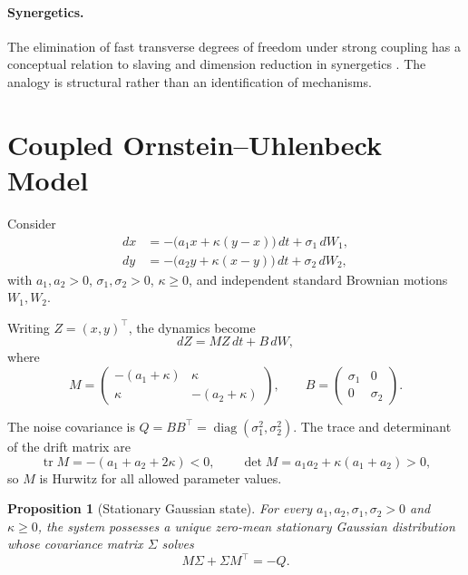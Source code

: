 \documentclass[11pt]{article}
\theoremstyle{plain}
\newtheorem{proposition}{Proposition}
\theoremstyle{remark}
\newcommand{\tr}{\operatorname{tr}}
\begin{document}
\paragraph{Synergetics.} The elimination of fast transverse degrees of freedom under strong
coupling has a conceptual relation to slaving and dimension reduction in synergetics
\cite{Haken1983}. The analogy is structural rather than an identification of mechanisms.

\section{Coupled Ornstein--Uhlenbeck Model}

Consider
\begin{align}
  dx &= -\bigl(a_1x+\kappa(y-x)\bigr)\,dt+\sigma_1\,dW_1, \label{eq:sde1}\\
  dy &= -\bigl(a_2y+\kappa(x-y)\bigr)\,dt+\sigma_2\,dW_2, \label{eq:sde2}
\end{align}
with $a_1,a_2>0$, $\sigma_1,\sigma_2>0$, $\kappa\ge0$, and independent standard Brownian
motions $W_1,W_2$.

Writing $Z=(x,y)^{\top}$, the dynamics become
\begin{equation}
  dZ = MZ\,dt + B\,dW, \label{eq:linear}
\end{equation}
where
\begin{equation}
  M=\begin{pmatrix}-(a_1+\kappa)&\kappa\\ \kappa&-(a_2+\kappa)\end{pmatrix},
  \qquad
  B=\begin{pmatrix}\sigma_1&0\\ 0&\sigma_2\end{pmatrix}. \label{eq:MB}
\end{equation}

The noise covariance is $Q=BB^{\top}=\operatorname{diag}(\sigma_1^2,\sigma_2^2)$. The trace and
determinant of the drift matrix are
\[
  \tr M=-(a_1+a_2+2\kappa)<0,
  \qquad
  \det M=a_1a_2+\kappa(a_1+a_2)>0,
\]
so $M$ is Hurwitz for all allowed parameter values.

\begin{proposition}[Stationary Gaussian state]\label{prop:stationary}
For every $a_1,a_2,\sigma_1,\sigma_2>0$ and $\kappa\ge0$, the system possesses a unique
zero-mean stationary Gaussian distribution whose covariance matrix $\Sigma$ solves
\begin{equation}
  M\Sigma+\Sigma M^{\top}=-Q. \label{eq:lyapunov}
\end{equation}
\end{proposition}
\end{document}
